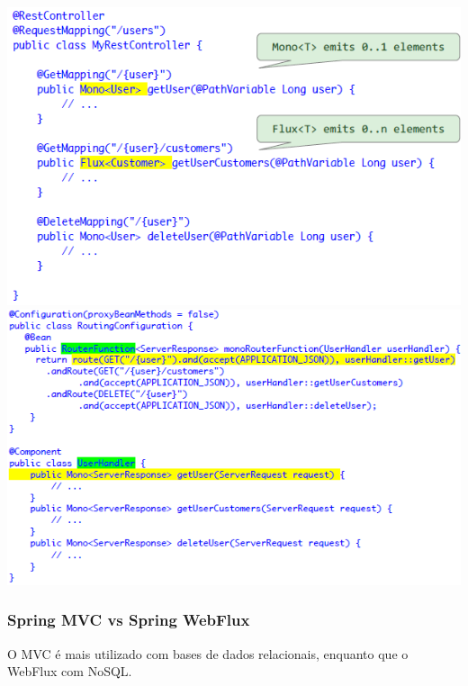 \documentclass{article}
\begin{document}
\begin{center}
  \includegraphics[scale=0.55]{97}
  \includegraphics[scale=0.55]{98}
\end{center}

\subsubsection{Spring MVC vs Spring WebFlux}

O MVC é mais utilizado com bases de dados relacionais, enquanto que o WebFlux com NoSQL.
\end{document}
